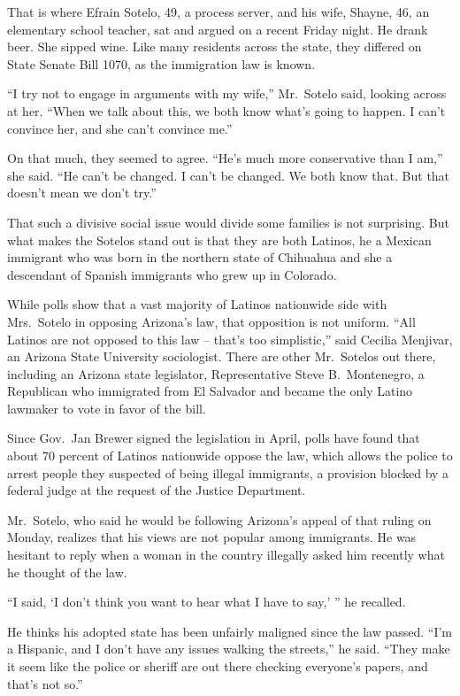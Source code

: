﻿\documentclass[12pt]{article}
\begin{document}
That is where Efrain Sotelo, 49, a process server, and his wife, Shayne, 46, an elementary school
teacher, sat and argued on a recent Friday night. He drank beer. She sipped wine. Like many
residents across the state, they differed on State Senate Bill 1070, as the immigration law is
known.

``I try not to engage in arguments with my wife,'' Mr.~Sotelo said, looking across at her. ``When we
talk about this, we both know what's going to happen. I can't convince her, and she can't convince
me.''

On that much, they seemed to agree. ``He's much more conservative than I am,'' she said. ``He can't
be changed. I can't be changed. We both know that. But that doesn't mean we don't try.''

That such a divisive social issue would divide some families is not surprising. But what makes the
Sotelos stand out is that they are both Latinos, he a Mexican immigrant who was born in the northern
state of Chihuahua and she a descendant of Spanish immigrants who grew up in Colorado.

While polls show that a vast majority of Latinos nationwide side with Mrs.~Sotelo in opposing
Arizona's law, that opposition is not uniform. ``All Latinos are not opposed to this law -- that's
too simplistic,'' said Cecilia Menjivar, an Arizona State University sociologist. There are other
Mr.~Sotelos out there, including an Arizona state legislator, Representative Steve B.~Montenegro, a
Republican who immigrated from El Salvador and became the only Latino lawmaker to vote in favor of
the bill.

Since Gov.~Jan Brewer signed the legislation in April, polls have found that about 70 percent of
Latinos nationwide oppose the law, which allows the police to arrest people they suspected of being
illegal immigrants, a provision blocked by a federal judge at the request of the Justice Department.

Mr.~Sotelo, who said he would be following Arizona's appeal of that ruling on Monday, realizes that
his views are not popular among immigrants. He was hesitant to reply when a woman in the country
illegally asked him recently what he thought of the law.

``I said, `I don't think you want to hear what I have to say,' '' he recalled.

He thinks his adopted state has been unfairly maligned since the law passed. ``I'm a Hispanic, and I
don't have any issues walking the streets,'' he said. ``They make it seem like the police or sheriff
are out there checking everyone's papers, and that's not so.''
\end{document}

